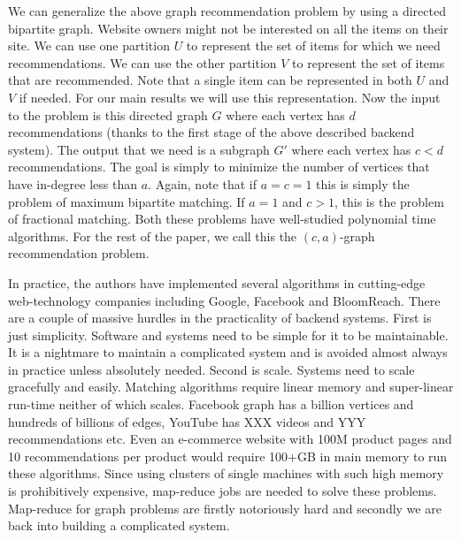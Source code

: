





We can generalize the above graph recommendation problem by using a directed bipartite graph.
Website owners might not be interested on all the items on their site. We can use one partition $U$
to represent the set of items for which we need recommendations. We can use the other partition $V$
to represent the set of items that are recommended. Note that a single item can be represented in
both $U$ and $V$ if needed. For our main results we will use this representation. Now the input
to the problem is this directed graph $G$ where each vertex has $d$ recommendations (thanks to the
first stage of the above described backend system). The output that we need is a subgraph $G'$
where each vertex has $c < d$ recommendations. The goal is simply to minimize the number of vertices
that have in-degree less than $a$. Again, note that if $a=c=1$ this is simply the problem of
maximum bipartite matching\cite{}. If $a=1$ and $c > 1$, this is the problem of fractional
matching\cite{}. Both these problems have well-studied polynomial time algorithms\cite{}. For the
rest of the paper, we call this the $(c, a)$-graph recommendation problem. \vs

In practice, the authors have implemented several algorithms in cutting-edge web-technology companies
including Google, Facebook and BloomReach. There are a couple of massive hurdles in the practicality
of backend systems. First is just simplicity. Software and systems need to be simple for it to be
maintainable. It is a nightmare to maintain a complicated system and is avoided almost always
in practice unless absolutely needed. Second is scale. Systems need to scale gracefully and easily. Matching
algorithms require linear memory and super-linear run-time neither of which scales. Facebook graph has
a billion vertices\cite{} and hundreds of billions of edges\cite{},
YouTube has XXX videos and YYY recommendations\cite{} etc. Even an e-commerce website with 100M product
pages and 10 recommendations per product would require 100+GB in main memory to run these algorithms. Since
using clusters of single machines with such high memory is prohibitively expensive, map-reduce\cite{} jobs
are needed to solve these problems. Map-reduce for graph problems are firstly notoriously hard and secondly
we are back into building a complicated system. \vs

